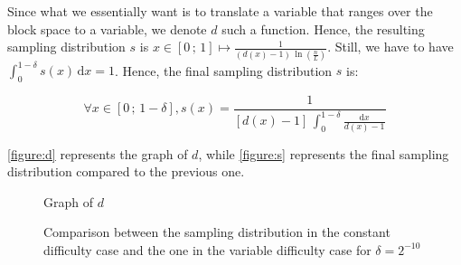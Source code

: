 \documentclass[11pt]{report}
\begin{document}
                Since what we essentially want is to translate a variable that ranges over the block space to a variable, we denote \(d\) such a function. Hence, the resulting sampling distribution \(s\) is \(x\in[0\,;\,1]\mapsto\frac{1}{(d(x) - 1)\,\ln\left(\frac{n}{L}\right)}\). Still, we have to have \(\int_0^{1-\delta}s(x)\,\mathrm{d}x=1\). Hence, the final sampling distribution \(s\) is:
                
                \[\forall x\in[0\,;\,1-\delta],s(x)=\frac{1}{[d(x)-1]\,\int_{0}^{1-\delta}\frac{\mathrm{d}x}{d(x)-1}}\]
                
                \autoref{figure:d} represents the graph of \(d\), while \autoref{figure:s} represents the final sampling distribution compared to the previous one.
                                
                \begin{figure}[ht]
                    \centering
                    \caption{Graph of \(d\)}
                    \label{figure:d}
                \end{figure}
                
                \begin{figure}[ht]
                    \centering
                    \caption{Comparison between the sampling distribution in the constant difficulty case and the one in the variable difficulty case for \(\delta=2^{-10}\)}
                    \label{figure:s}
                \end{figure}
                
\end{document}
